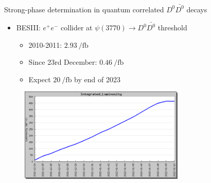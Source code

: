 \documentclass{beamer}
\begin{document}
\begin{frame}{Strong-phase determination in quantum correlated $D^0\bar{D^0}$ decays}
  \begin{itemize}
    \item{BESIII: $e^+e^-$ collider at $\psi(3770)\to D^0\bar{D^0}$ threshold}
    \begin{itemize}
      \item{2010-2011: $\SI{2.93}{\per\femto\barn}$}
      \item{Since 23rd December: $\SI{0.46}{\per\femto\barn}$}
      \item{Expect $\SI{20}{\per\femto\barn}$ by end of 2023}
    \end{itemize}
  \end{itemize}
  \begin{figure}
    \includegraphics[width = 0.70\textwidth]{Plots/BES3_Integrated_Luminosity.png}
  \end{figure}
\end{frame}
\end{document}
